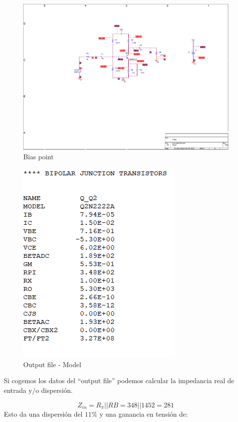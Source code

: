     \begin{figure}[H]
    \centering  
    \includegraphics[scale=0.8,page=1,clip, trim=7.5cm 9cm 2cm
    2cm]{images/biaspoint_problema_puntuable.pdf}
    \caption{Bias point}
  \end{figure}
      \begin{figure}[H]
    \centering  
    \includegraphics[scale=1]{images/model.png}
    \caption{Output file - Model}
  \end{figure}

Si cogemos los datos del ``output file'' podemos calcular la
impedancia real de entrada y/o dispersión.

\[Z_{in} = R_{\pi}||RB = 348||1452 = 281\]
Esto da una dispersión del $11\%$ y una ganancia en tensión de:

